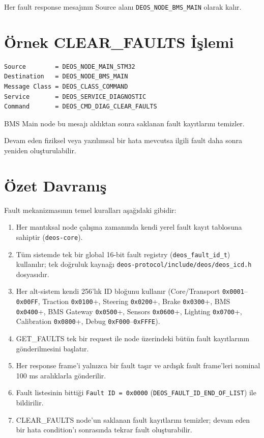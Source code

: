 \documentclass[a4paper,11pt]{article}
\newcommand{\hex}[1]{\texttt{0x#1}}
\newcommand{\code}[1]{\texttt{#1}}
\begin{document}
Her fault response mesajının Source alanı
\texttt{DEOS\_NODE\_BMS\_MAIN} olarak kalır.

\section{Örnek CLEAR\_FAULTS İşlemi}

\begin{lstlisting}
Source        = DEOS_NODE_MAIN_STM32
Destination   = DEOS_NODE_BMS_MAIN
Message Class = DEOS_CLASS_COMMAND
Service       = DEOS_SERVICE_DIAGNOSTIC
Command       = DEOS_CMD_DIAG_CLEAR_FAULTS
\end{lstlisting}

BMS Main node bu mesajı aldıktan sonra saklanan fault kayıtlarını
temizler.

Devam eden fiziksel veya yazılımsal bir hata mevcutsa ilgili
fault daha sonra yeniden oluşturulabilir.

\section{Özet Davranış}

Fault mekanizmasının temel kuralları aşağıdaki gibidir:

\begin{enumerate}
    \item Her mantıksal node çalışma zamanında kendi yerel fault kayıt tablosuna sahiptir (\code{deos-core}).

    \item Tüm sistemde tek bir global 16-bit fault registry (\code{deos\_fault\_id\_t}) kullanılır; tek doğruluk kaynağı \code{deos-protocol/include/deos/deos\_icd.h} dosyasıdır.

    \item Her alt-sistem kendi 256'lık ID bloğunu kullanır (Core/Transport \hex{0001}--\hex{00FF}, Traction \hex{0100}+, Steering \hex{0200}+, Brake \hex{0300}+, BMS \hex{0400}+, BMS Gateway \hex{0500}+, Sensors \hex{0600}+, Lighting \hex{0700}+, Calibration \hex{0800}+, Debug \hex{F000}--\hex{FFFE}).

    \item GET\_FAULTS tek bir request ile node üzerindeki bütün fault kayıtlarının gönderilmesini başlatır.

    \item Her response frame'i yalnızca bir fault taşır ve ardışık fault frame'leri nominal 100 ms aralıklarla gönderilir.

    \item Fault listesinin bittiği \code{Fault ID = 0x0000} (\code{DEOS\_FAULT\_ID\_END\_OF\_LIST}) ile bildirilir.

    \item CLEAR\_FAULTS node'un saklanan fault kayıtlarını temizler; devam eden bir hata condition'ı sonrasında tekrar fault oluşturabilir.
\end{enumerate}
\end{document}
